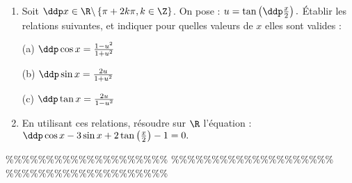 



\begin{exercice}  \;
\begin{enumerate}
\item Soit $\ddp x \in \R\backslash \left\{ \pi + 2 k \pi, k \in \Z \right\}$. On pose : $u =  \tan \left(\ddp \frac{x}{2} \right).$ \'Etablir les relations suivantes, et indiquer pour quelles valeurs de $x$ elles sont valides :\\
\begin{minipage}[t]{0.3\textwidth}
(a) $\ddp \cos x = \frac{1-u^2}{1+u^2}$
\end{minipage}
\begin{minipage}[t]{0.3\textwidth}
(b)  $\ddp \sin x = \frac{2 u}{1+u^2}$
\end{minipage}
\begin{minipage}[t]{0.3\textwidth}
(c) $\ddp \tan x = \frac{2 u}{1-u^2}$
\end{minipage}
\item En utilisant ces relations, r\'esoudre sur $\R$ l'\'equation : $\ddp \cos x - 3 \sin x + 2\tan \left( \frac{x}{2} \right) - 1 = 0.$
\end{enumerate}
\end{exercice}


\%\%\%\%\%\%\%\%\%\%\%\%\%\%\%\%\%\%\%\%
\%\%\%\%\%\%\%\%\%\%\%\%\%\%\%\%\%\%\%\%
\%\%\%\%\%\%\%\%\%\%\%\%\%\%\%\%\%\%\%\%



